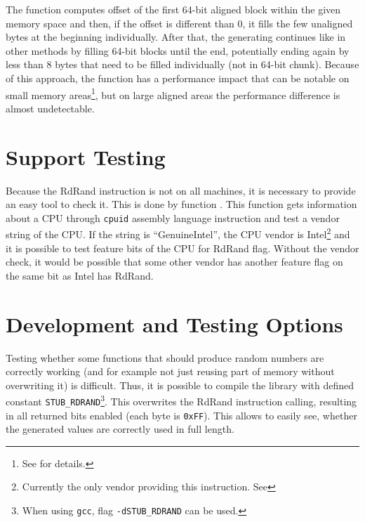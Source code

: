 \par{
The function computes offset of the first 64-bit aligned block within the given memory space and then, if the offset is different than 0, it fills the few unaligned bytes at the beginning individually. After that, the generating continues like in other methods by filling 64-bit blocks until the end, potentially ending again by less than 8 bytes that need to be filled individually (not in 64-bit chunk). Because of this approach, the function has a performance impact that can be notable on small memory areas\footnote{See  for details.}, but on large aligned areas the performance difference is almost undetectable. 
}

\section{Support Testing}
\par{
Because the RdRand instruction is not on all machines, it is necessary to provide an easy tool to check it. This is done by function . This function gets information about a CPU through {\tt cpuid} assembly language instruction and test a vendor string of the CPU. If the string is ``GenuineIntel'', the CPU vendor is Intel\footnote{Currently the only vendor providing this instruction. See } and it is possible to test feature bits of the CPU for RdRand flag. Without the vendor check, it would be possible that some other vendor has another feature flag on the same bit as Intel has RdRand.
}

\section{Development and Testing Options}
\par{
Testing whether some functions that should produce random numbers are correctly working (and for example not just reusing part of memory without overwriting it) is difficult. Thus, it is possible to compile the library with defined constant {\tt STUB\_RDRAND}\footnote{When using {\tt gcc}, flag {\tt -dSTUB\_RDRAND} can be used.}. This overwrites the RdRand instruction calling, resulting in all returned bits enabled (each byte is {\tt 0xFF}). This allows to easily see, whether the generated values are correctly used in full length.
}

